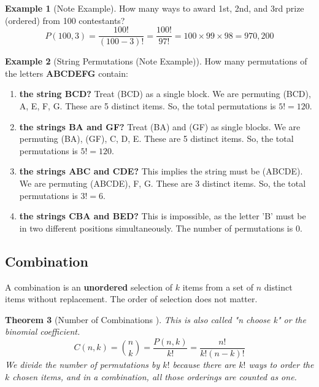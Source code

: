 \documentclass[11pt, a4paper]{article}
\newtheorem{theorem}{Theorem}[section]
\theoremstyle{definition}
\newtheorem{example}[theorem]{Example}
\begin{document}
\begin{example}[Note Example]
How many ways to award 1st, 2nd, and 3rd prize (ordered) from 100 contestants?
\[
P(100, 3) = \frac{100!}{(100-3)!} = \frac{100!}{97!} = 100 \times 99 \times 98 = 970,200
\]
\end{example}

\begin{example}[String Permutations (Note Example)]
How many permutations of the letters \textbf{ABCDEFG} contain:
\begin{enumerate}
    \item[a)] \textbf{the string BCD?}
    Treat (BCD) as a single block. We are permuting (BCD), A, E, F, G.
    These are 5 distinct items. So, the total permutations is $5! = 120$.
    
    \item[b)] \textbf{the strings BA and GF?}
    Treat (BA) and (GF) as single blocks. We are permuting (BA), (GF), C, D, E.
    These are 5 distinct items. So, the total permutations is $5! = 120$.
    
    \item[c)] \textbf{the strings ABC and CDE?}
    This implies the string must be (ABCDE). We are permuting (ABCDE), F, G.
    These are 3 distinct items. So, the total permutations is $3! = 6$.

    \item[d)] \textbf{the strings CBA and BED?}
    This is impossible, as the letter 'B' must be in two different positions simultaneously. The number of permutations is 0.
\end{enumerate}
\end{example}

\subsection{Combination}
A combination is an \textbf{unordered} selection of $k$ items from a set of $n$ distinct items without replacement. The order of selection does not matter.

\begin{theorem}[Number of Combinations \cite{Chan2021}]
This is also called "n choose k" or the binomial coefficient.
\[
C(n, k) = \binom{n}{k} = \frac{P(n, k)}{k!} = \frac{n!}{k!(n-k)!}
\]
We divide the number of permutations by $k!$ because there are $k!$ ways to order the $k$ chosen items, and in a combination, all those orderings are counted as one.
\end{theorem}
\end{document}
